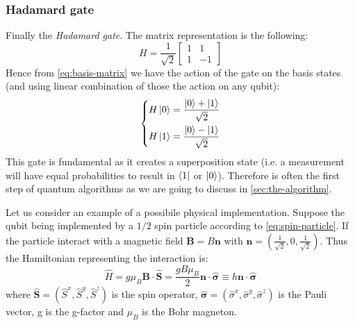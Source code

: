 \subsubsection{Hadamard gate}
Finally the \emph{Hadamard gate}. The matrix representation is the following:
\begin{equation}\label{eq:hadamard-gate}
    H = \frac{1}{\sqrt{2}}
    \begin{bmatrix}
    1 & 1\\
    1 & -1
    \end{bmatrix}
\end{equation}
Hence from \eqref{eq:basis-matrix} we have the action of the gate on the basis states (and using linear combination of those the action on any qubit):
\begin{equation}
\left\{
\begin{aligned}
    H\ket{0} &= \frac{\ket{0} + \ket{1}}{\sqrt{2}} \\
    H\ket{1} &= \frac{\ket{0} - \ket{1}}{\sqrt{2}}
\end{aligned}
\right.
\end{equation}
This gate is fundamental as it creates a superposition state (i.e. a measurement will have equal probabilities to result in $\bra{1}$ or $\ket{0}$). Therefore is often the first step of quantum algorithms as we are going to discuss in \ref{sec:the-algorithm}.

Let us consider an example of a possibile physical implementation. Suppose the qubit being implemented by a $1/2$ spin particle according to \eqref{eq:spin-particle}. If the particle interact with a magnetic field $\boldsymbol{B} = B\boldsymbol{n}$ with $\boldsymbol{n} = (\frac{1}{\sqrt{2}}, 0, \frac{1}{\sqrt{2}})$. Thus the Hamiltonian representing the interaction is:
\begin{equation*}
    \hat{H} = g\mu_B \boldsymbol{B} \cdot \hat{\boldsymbol{S}} = \frac{gB\mu_B}{2} \boldsymbol{n} \cdot \hat{\boldsymbol{\sigma}} \equiv h \boldsymbol{n} \cdot \hat{\boldsymbol{\sigma}}
\end{equation*}
where $\hat{\boldsymbol{S}} = (\hat{S}^x, \hat{S}^y, \hat{S}^z)$ is the spin operator, $\hat{\boldsymbol{\sigma}} = (\hat{\sigma}^x, \hat{\sigma}^y, \hat{\sigma}^z)$ is the Pauli vector, g is the g-factor and $\mu_B$ is the Bohr magneton.

